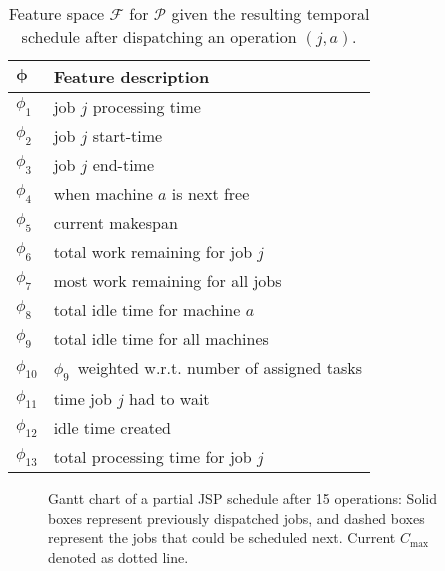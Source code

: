 \documentclass[a4paper,twoside]{article}
\newcommand{\vphi}{{\boldsymbol{\phi}}}
\newcommand{\phiproc}{$\phi_1$}
\newcommand{\phistartTime}{$\phi_2$}
\newcommand{\phiendTime}{$\phi_3$}
\newcommand{\phimacFree}{$\phi_4$}
\newcommand{\phimakespan}{$\phi_5$}
\newcommand{\phiwrmJob}{$\phi_6$}
\newcommand{\phiwrmMWR}{$\phi_7$}
\newcommand{\phislots}{$\phi_{8}$}
\newcommand{\phislotsTotal}{$\phi_{9}$}
\newcommand{\phislotsTotalperOp}{$\phi_{10}$}
\newcommand{\phiwait}{$\phi_{11}$}
\newcommand{\phislotCreated}{$\phi_{12}$}
\newcommand{\phitotProc}{$\phi_{13}$}
\begin{document}
\begin{table}  
  \caption{Feature space $\mathcal{F}$ for $\mathcal{P}$ given the resulting temporal schedule after dispatching an operation $(j,a)$.  }
  \label{tbl:jssp:feat}

\centering
  \begin{tabular}{ll} %
\toprule
  $\vphi$ & Feature description \\
\midrule
  \phiproc & job $j$ processing time \\
  \phistartTime & job $j$ start-time \\
  \phiendTime & job $j$ end-time\\
  \phimacFree & when machine $a$ is next free \\
  \phimakespan & current makespan \\   
  \phiwrmJob & total work remaining for job $j$ \\
  \phiwrmMWR & most work remaining for all jobs\\
  \phislots & total idle time for machine $a$ \\
  \phislotsTotal & total idle time for all machines \\
  \phislotsTotalperOp & \phislotsTotal\ weighted w.r.t. number of assigned tasks\\
  \phiwait & time job $j$ had to wait \\
  \phislotCreated & idle time created \\      
  \phitotProc & total processing time for job $j$ \\
\bottomrule
  \end{tabular}



\end{table}

\begin{figure*}[t!]\centering 
{}
\caption[Gantt chart of a partial JSP schedule]{Gantt chart of a partial JSP schedule after 15 operations: Solid boxes represent previously dispatched jobs, and dashed boxes represent  the jobs
that could be scheduled next. Current $C_{\max}$ denoted as dotted line.}
\label{fig:jssp:example}
\end{figure*}
\end{document}
